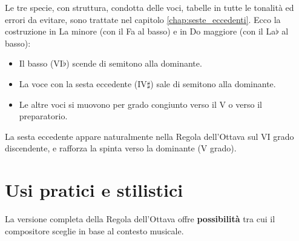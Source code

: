 Le tre specie, con struttura, condotta delle voci, tabelle in tutte le tonalità ed errori da evitare, sono trattate nel capitolo \ref{chap:seste_eccedenti}. Ecco la costruzione in La minore (con il Fa al basso) e in Do maggiore (con il La$\flat$ al basso):

\begin{regola}
    \label{reg:risoluzione_sesta_eccedente}
    \begin{itemize}
        \item Il basso (VI$\flat$) scende di semitono alla dominante.
        \item La voce con la sesta eccedente (IV$\sharp$) sale di semitono alla dominante.
        \item Le altre voci si muovono per grado congiunto verso il V o verso il  preparatorio.
    \end{itemize}
\end{regola}

La sesta eccedente appare naturalmente nella Regola dell'Ottava sul VI grado discendente, e rafforza la spinta verso la dominante (V grado).

\section{Usi pratici e stilistici}
\label{sec:usi_pratici_completi}

La versione completa della Regola dell'Ottava offre \textbf{possibilità} tra cui il compositore sceglie in base al contesto musicale.

